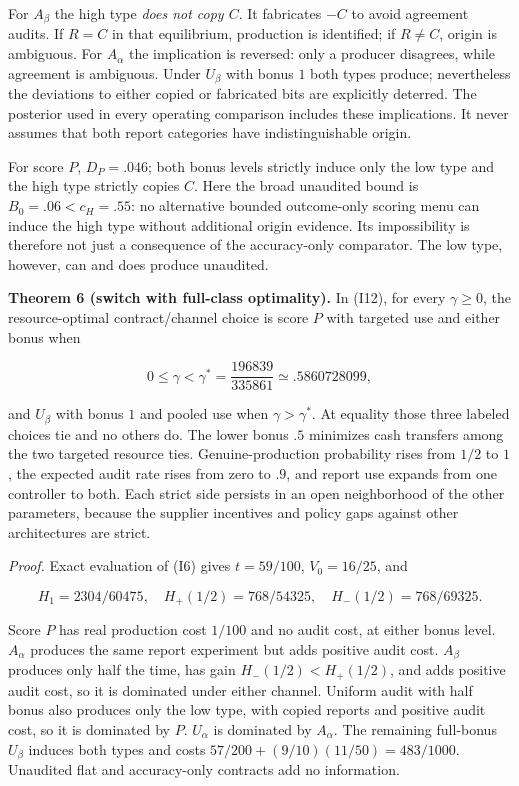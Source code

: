 \documentclass[
  11pt,
]{article}
\begin{document}
For \(A_\beta\) the high type \emph{does not copy \(C\)}. It fabricates
\(-C\) to avoid agreement audits. If \(R=C\) in that equilibrium,
production is identified; if \(R\ne C\), origin is ambiguous. For
\(A_\alpha\) the implication is reversed: only a producer disagrees,
while agreement is ambiguous. Under \(U_\beta\) with bonus \(1\) both
types produce; nevertheless the deviations to either copied or
fabricated bits are explicitly deterred. The posterior used in every
operating comparison includes these implications. It never assumes that
both report categories have indistinguishable origin.

For score \(P\), \(D_P=.046\); both bonus levels strictly induce only
the low type and the high type strictly copies \(C\). Here the broad
unaudited bound is \(B_0=.06<c_H=.55\): no alternative bounded
outcome-only scoring menu can induce the high type without additional
origin evidence. Its impossibility is therefore not just a consequence
of the accuracy-only comparator. The low type, however, can and does
produce unaudited.

\textbf{Theorem 6 (switch with full-class optimality).} In (I12), for
every \(\gamma\geq0\), the resource-optimal contract/channel choice is
score \(P\) with targeted use and either bonus when

\[0\leq\gamma<\gamma^*=\frac{196839}{335861}
\simeq .5860728099, \tag{I13}\]

and \(U_\beta\) with bonus \(1\) and pooled use when
\(\gamma>\gamma^*\). At equality those three labeled choices tie and no
others do. The lower bonus \(.5\) minimizes cash transfers among the two
targeted resource ties. Genuine-production probability rises from
\(1/2\) to \(1\), the expected audit rate rises from zero to \(.9\), and
report use expands from one controller to both. Each strict side
persists in an open neighborhood of the other parameters, because the
supplier incentives and policy gaps against other architectures are
strict.

\emph{Proof.} Exact evaluation of (I6) gives \(t=59/100\),
\(V_0=16/25\), and

\[H_1=2304/60475,\quad H_+(1/2)=768/54325,\quad
H_-(1/2)=768/69325.\]

Score \(P\) has real production cost \(1/100\) and no audit cost, at
either bonus level. \(A_\alpha\) produces the same report experiment but
adds positive audit cost. \(A_\beta\) produces only half the time, has
gain \(H_-(1/2)<H_+(1/2)\), and adds positive audit cost, so it is
dominated under either channel. Uniform audit with half bonus also
produces only the low type, with copied reports and positive audit cost,
so it is dominated by \(P\). \(U_\alpha\) is dominated by \(A_\alpha\).
The remaining full-bonus \(U_\beta\) induces both types and costs
\(57/200+(9/10)(11/50)=483/1000\). Unaudited flat and accuracy-only
contracts add no information.
\end{document}
